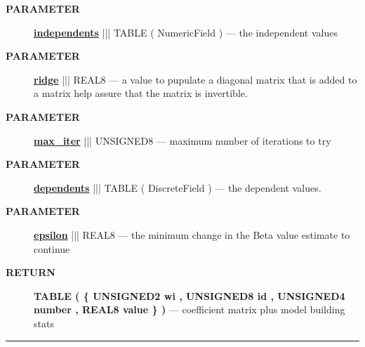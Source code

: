 \par
\begin{description}
\item [\colorbox{tagtype}{\color{white} \textbf{\textsf{PARAMETER}}}] \textbf{\underline{independents}} ||| TABLE ( NumericField ) --- the independent values
\item [\colorbox{tagtype}{\color{white} \textbf{\textsf{PARAMETER}}}] \textbf{\underline{ridge}} ||| REAL8 --- a value to pupulate a diagonal matrix that is added to a matrix help assure that the matrix is invertible.
\item [\colorbox{tagtype}{\color{white} \textbf{\textsf{PARAMETER}}}] \textbf{\underline{max\_iter}} ||| UNSIGNED8 --- maximum number of iterations to try
\item [\colorbox{tagtype}{\color{white} \textbf{\textsf{PARAMETER}}}] \textbf{\underline{dependents}} ||| TABLE ( DiscreteField ) --- the dependent values.
\item [\colorbox{tagtype}{\color{white} \textbf{\textsf{PARAMETER}}}] \textbf{\underline{epsilon}} ||| REAL8 --- the minimum change in the Beta value estimate to continue
\end{description}







\par
\begin{description}
\item [\colorbox{tagtype}{\color{white} \textbf{\textsf{RETURN}}}] \textbf{TABLE ( \{ UNSIGNED2 wi , UNSIGNED8 id , UNSIGNED4 number , REAL8 value \} )} --- coefficient matrix plus model building stats
\end{description}




\rule{\linewidth}{0.5pt}
